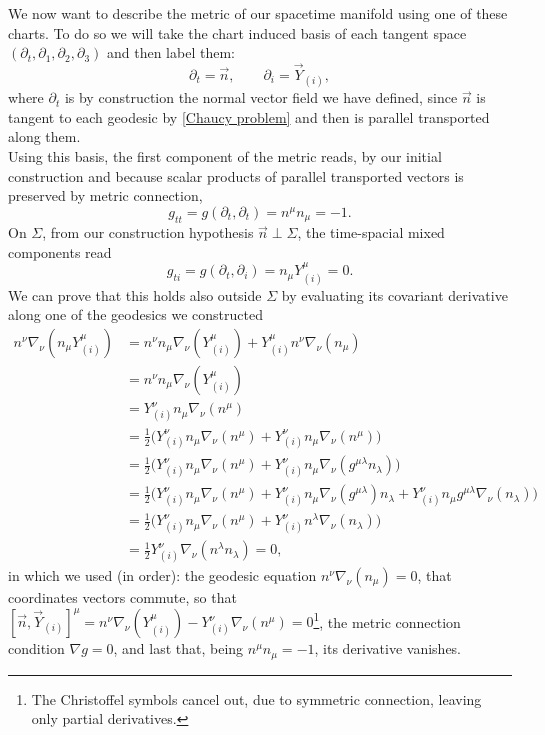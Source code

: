 We now want to describe the metric of our spacetime manifold using one of these charts. To do so we will take the chart induced basis of each tangent space $(\partial_t,\partial_1,\partial_2,\partial_3)$ and then label them:
\begin{equation*}
    \partial_t=\vec n,\qquad \partial_i= \vec Y_{(i)},
\end{equation*}
where $\partial_t$ is by construction the normal vector field we have defined, since $\vec n$ is tangent to each geodesic by \eqref{Chaucy problem} and then is parallel transported along them.\\
Using this basis, the first component of the metric reads, by our initial construction and because scalar products of parallel transported vectors is preserved by metric connection,
\begin{equation}
    g_{tt}=g(\partial_t,\partial_t)=n^\mu n_\mu=-1.\label{gen gtt}
\end{equation} 
On $\Sigma$, from our construction hypothesis $\vec{n}\perp\Sigma $, the time-spacial mixed components read 
\begin{equation}
    g_{ti}=g(\partial_t,\partial_i)=n_\mu Y^\mu_{(i)}=0.\label{gen gti}
\end{equation} 
We can prove that this holds also outside $\Sigma$ by evaluating its covariant derivative along one of the geodesics we constructed
\begin{align*}
    n^\nu\nabla_\nu(n_\mu Y_{(i)}^\mu)&=n^\nu n_\mu \nabla_\nu( Y_{(i)}^\mu)+Y_{(i)}^\mu n^\nu  \nabla_\nu(n_\mu )\\
    &=n^\nu n_\mu \nabla_\nu( Y_{(i)}^\mu)\\
    &=Y^\nu_{(i)}n_\mu\nabla_\nu(n^\mu)\\
    &=\frac{1}{2}\big(Y^\nu_{(i)}n_\mu\nabla_\nu(n^\mu)+Y^\nu_{(i)}n_\mu\nabla_\nu(n^\mu)\big)\\
    &=\frac{1}{2}\big(Y^\nu_{(i)}n_\mu\nabla_\nu(n^\mu)+Y^\nu_{(i)}n_\mu\nabla_\nu(g^{\mu\lambda}n_{\lambda})\big)\\
    &=\frac{1}{2}\big(Y^\nu_{(i)}n_\mu\nabla_\nu(n^\mu)+Y^\nu_{(i)}n_\mu\nabla_\nu(g^{\mu\lambda})n_{\lambda}+Y^\nu_{(i)}n_\mu g^{\mu\lambda}\nabla_\nu(n_{\lambda})\big)\\
    &=\frac{1}{2}\big(Y^\nu_{(i)}n_\mu\nabla_\nu(n^\mu)+Y^\nu_{(i)}n^\lambda\nabla_\nu(n_{\lambda})\big)\\
    &=\frac{1}{2}Y^\nu_{(i)}\nabla_\nu(n^\lambda n_\lambda)=0,
\end{align*}
in which we used (in order): the geodesic equation $n^\nu  \nabla_\nu(n_\mu )=0$, that coordinates vectors commute, so that $[\vec n,\vec Y_{(i)}]^\mu=n^\nu \nabla_\nu( Y_{(i)}^\mu)-Y^\nu_{(i)}\nabla_\nu(n^\mu)=0$\footnote{The Christoffel symbols cancel out, due to symmetric connection, leaving only partial derivatives.}, the metric connection condition $\nabla g=0$, and last that, being $n^\mu n_\mu=-1$, its derivative vanishes.

